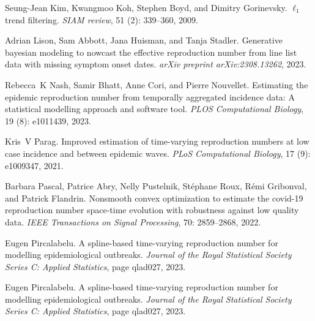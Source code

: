 \documentclass[10pt,letterpaper]{article}
\begin{document}
\begin{thebibliography}{27}
  Seung-Jean Kim, Kwangmoo Koh, Stephen Boyd, and Dimitry Gorinevsky.
  \newblock $\ell_1$ trend filtering.
  \newblock \emph{SIAM review}, 51 (2): 339--360, 2009.
  
  Adrian Lison, Sam Abbott, Jana Huisman, and Tanja Stadler.
  \newblock Generative bayesian modeling to nowcast the effective reproduction
    number from line list data with missing symptom onset dates.
  \newblock \emph{arXiv preprint arXiv:2308.13262}, 2023.
  
  Rebecca~K Nash, Samir Bhatt, Anne Cori, and Pierre Nouvellet.
  \newblock Estimating the epidemic reproduction number from temporally
    aggregated incidence data: A statistical modelling approach and software
    tool.
  \newblock \emph{PLOS Computational Biology}, 19 (8):
    e1011439, 2023.
  
  Kris~V Parag.
  \newblock Improved estimation of time-varying reproduction numbers at low case
    incidence and between epidemic waves.
  \newblock \emph{PLoS Computational Biology}, 17 (9):
    e1009347, 2021.
  
  Barbara Pascal, Patrice Abry, Nelly Pustelnik, St{\'e}phane Roux, R{\'e}mi
    Gribonval, and Patrick Flandrin.
  \newblock Nonsmooth convex optimization to estimate the covid-19 reproduction
    number space-time evolution with robustness against low quality data.
  \newblock \emph{IEEE Transactions on Signal Processing}, 70:
    2859--2868, 2022.
  
  Eugen Pircalabelu.
  \newblock A spline-based time-varying reproduction number for modelling
    epidemiological outbreaks.
  \newblock \emph{Journal of the Royal Statistical Society Series C: Applied
    Statistics}, page qlad027, 2023{}.
  
  Eugen Pircalabelu.
  \newblock A spline-based time-varying reproduction number for modelling
    epidemiological outbreaks.
  \newblock \emph{Journal of the Royal Statistical Society Series C: Applied
    Statistics}, page qlad027, 2023{}.
  

\end{thebibliography}
\end{document}

